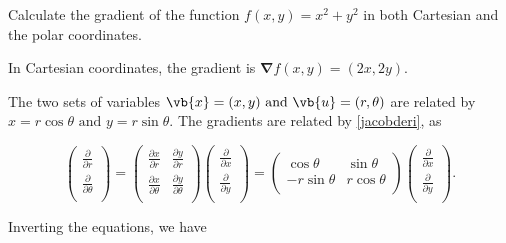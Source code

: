 \documentclass[english,a4paper,12pt]{report}
\begin{document}
{Calculate the gradient of the function \(f(x,y) = x^2+y^2\) in both Cartesian and the polar coordinates.}
{In Cartesian coordinates, the gradient is \(\boldsymbol{\nabla }f(x,y)   = (2x,2y) \). 

The two sets of variables \(\vb{x} = (x,y) \text { and } \vb{u} = (r,\theta )\) are related by \(x = r\cos \theta \text { and } y = r\sin \theta \). The gradients are related by \cref{jacobderi}, as

\begin{equation}
	\begin{pmatrix}
		 \frac{\partial }{\partial r}  \\
		 \frac{\partial }{\partial \theta }  \\
	\end{pmatrix}  = \begin{pmatrix}
		\frac{\partial x}{\partial r}  & \frac{\partial y}{\partial r}   \\
		\frac{\partial x}{\partial \theta }  & \frac{\partial y}{\partial \theta }   \\
	\end{pmatrix} \begin{pmatrix}
		 \frac{\partial }{\partial x}  \\
		 \frac{\partial }{\partial y}  \\
	\end{pmatrix}  = \begin{pmatrix}
		\cos \theta  & \sin \theta   \\
		-r\sin \theta  & r\cos \theta   \\
	\end{pmatrix} \begin{pmatrix}
		 \frac{\partial }{\partial x}  \\
		 \frac{\partial }{\partial y}  \\
	\end{pmatrix}.
\end{equation}

Inverting the equations, we have

}
\end{document}
